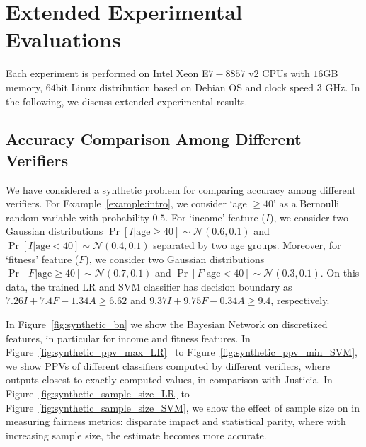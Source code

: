 	
	\section{Extended Experimental Evaluations}
	\label{appendix:experiments}
	Each experiment is performed on Intel Xeon E$ 7-8857 $ v$2 $ CPUs with $ 16 $GB memory, $ 64 $bit Linux distribution based on Debian OS and clock speed $ 3 $ GHz. In the following, we discuss extended experimental results.



	\subsection{Accuracy Comparison Among Different Verifiers}
	We have considered a synthetic problem for comparing accuracy among different verifiers. For Example~\ref{example:intro}, we consider `age $ \ge 40 $' as a Bernoulli random  variable with probability $ 0.5 $. For `income' feature ($ I $), we consider two Gaussian distributions $ \Pr[I | \text{age} \ge 40] \sim \mathcal{N}(0.6, 0.1) $ and $ \Pr[I | \text{age} < 40] \sim \mathcal{N}(0.4, 0.1) $ separated by two age groups. Moreover, for `fitness' feature ($ F $), we consider two Gaussian distributions $ \Pr[F | \text{age} \ge 40] \sim \mathcal{N}(0.7, 0.1) $ and $ \Pr[F | \text{age} < 40] \sim \mathcal{N}(0.3, 0.1) $. On this data, the trained LR and SVM classifier has decision boundary as $ 7.26I + 7.4F - 1.34A \ge 6.62 $ and $ 9.37I + 9.75F - 0.34A \ge 9.4 $, respectively.
	
	
	In Figure~\ref{fig:synthetic_bn} we show the Bayesian Network on discretized features, in particular for income and fitness features. In Figure~\ref{fig:synthetic_ppv_max_LR} \ to Figure~\ref{fig:synthetic_ppv_min_SVM}, we show PPVs of different classifiers computed by different verifiers, where  {\framework} outputs closest to exactly computed values, in comparison with Justicia. In Figure~\ref{fig:synthetic_sample_size_LR} to Figure~\ref{fig:synthetic_sample_size_SVM}, we show the effect of sample size on {\framework} in measuring fairness metrics: disparate impact and statistical parity, where with increasing sample size, the estimate becomes more accurate.
	

